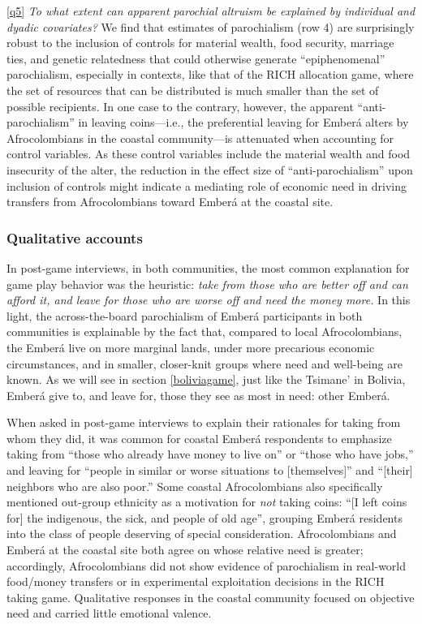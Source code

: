 \documentclass[bibauthoryear]{aa}
\begin{document}
\ref{q5} \emph{To what extent can apparent parochial altruism be explained by individual and dyadic covariates?}
We find that estimates of parochialism (row 4) are surprisingly robust to the inclusion of controls for material wealth, food security, marriage ties, and genetic relatedness that could otherwise generate ``epiphenomenal'' parochialism, especially in contexts, like that of the RICH allocation game, where the set of resources that can be distributed is much smaller than the set of possible recipients. In one case to the contrary, however, the apparent  ``anti-parochialism'' in leaving coins---i.e., the preferential leaving for Ember\'a alters by Afrocolombians in the coastal community---is attenuated when accounting for control variables. As these control variables include the material wealth and food insecurity of the alter, the reduction in the effect size of ``anti-parochialism'' upon inclusion of controls might indicate a mediating role of economic need in driving transfers from Afrocolombians toward Ember\'a at the coastal site. 



\subsubsection{Qualitative accounts}\label{qual}
In post-game interviews, in both communities, the most common explanation for game play behavior was the heuristic: \textit{take from those who are better off and can afford it, and leave for those who are worse off and  need the money more. } In this light, the across-the-board parochialism of Ember\'a participants in both communities is explainable by the fact that, compared to local Afrocolombians, the Ember\'a live on more marginal lands, under more precarious economic circumstances, and in smaller, closer-knit groups where need and well-being are known. As we will see in section \ref{boliviagame}, just like the Tsimane' in Bolivia, Ember\'a give to, and leave for, those they see as most in need: other Ember\'a.

When asked in post-game interviews to explain their rationales for taking from whom they did, it was common for coastal Ember\'a respondents to emphasize taking from ``those who already have money to live on'' or ``those who have jobs,'' and leaving for ``people  in similar or worse situations to [themselves]'' and ``[their] neighbors who are also poor.'' Some coastal Afrocolombians also specifically mentioned out-group ethnicity as a motivation for \textit{not} taking coins: ``[I left coins for] the indigenous, the sick, and people of old age'', grouping Ember\'a residents into the class of people deserving of special consideration. Afrocolombians and Ember\'a at the coastal site both agree on whose relative need is greater; accordingly, Afrocolombians did not show evidence of parochialism in real-world food/money transfers or in experimental exploitation decisions in the RICH taking game. Qualitative responses in the coastal community focused on objective need and carried little emotional valence.
\end{document}
